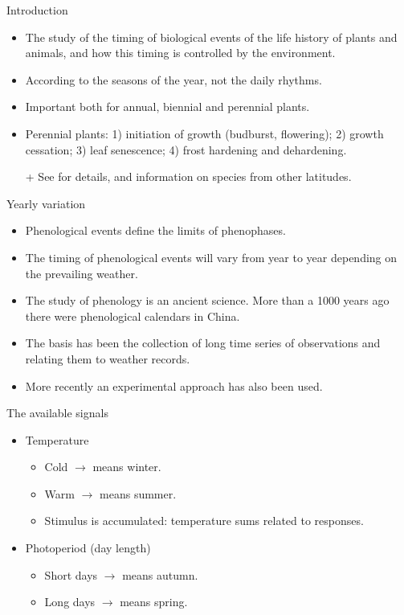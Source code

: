 \documentclass[10pt]{beamer}
\begin{document}
\begin{frame}{Introduction}
    \begin{itemize}
        \item The study of the timing of biological events of
        the life history of plants and animals, and how
        this timing is controlled by the environment.
        \item According to the seasons of the year, not the daily
        rhythms.
        \item Important both for annual, biennial and perennial
        plants.
        \item Perennial plants: 1) initiation of growth
        (budburst, flowering); 2) growth cessation; 3) leaf senescence; 4) frost hardening and
        dehardening.
        \item[+] See \autocite{Larcher2003} for details, and
        information on species from other latitudes.
    \end{itemize}
\end{frame}

\begin{frame}{Yearly variation}
    \begin{itemize}
        \item Phenological events define the limits of
        phenophases.%
        \item The timing of phenological events will vary from
        year to year depending on the prevailing weather.%
        \item The study of phenology is an ancient science. More
        than a 1000 years ago there were phenological calendars in
        China.%
        \item The basis has been the collection of long time
        series of observations and relating them to weather records.%
        \item More recently an experimental approach has also
        been used.%
    \end{itemize}
\end{frame}

\begin{frame}{The available signals}
    \begin{itemize}
        \item Temperature
        \begin{itemize}
            \item Cold $\rightarrow$ means winter.
            \item Warm $\rightarrow$ means summer.
            \item Stimulus is accumulated: temperature sums related to responses.
        \end{itemize}
        \item Photoperiod (day length)
        \begin{itemize}
            \item Short days $\rightarrow$ means autumn.
            \item Long days $\rightarrow$ means spring.
        \end{itemize}
    \end{itemize}
\end{frame}
\end{document}
